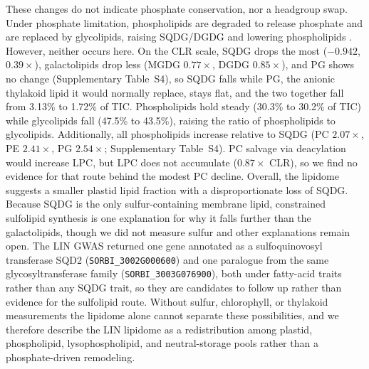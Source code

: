 These changes do not indicate phosphate conservation, nor a headgroup swap. Under phosphate limitation, phospholipids are degraded to release phosphate and are replaced by glycolipids, raising SQDG/DGDG and lowering phospholipids \citep{Essigmann1998, Hartel2000, Jouhet2004, KellyDormann2002, Pfaff2020}. However, neither occurs here. On the CLR scale, SQDG drops the most ($-0.942$, $0.39\times$), galactolipids drop less (MGDG $0.77\times$, DGDG $0.85\times$), and PG shows no change (Supplementary Table~S4), so SQDG falls while PG, the anionic thylakoid lipid it would normally replace, stays flat, and the two together fall from 3.13\% to 1.72\% of TIC. Phospholipids hold steady (30.3\% to 30.2\% of TIC) while glycolipids fall (47.5\% to 43.5\%), raising the ratio of phospholipids to glycolipids. Additionally, all phospholipids increase relative to SQDG (PC $2.07\times$, PE $2.41\times$, PG $2.54\times$; Supplementary Table~S4). PC salvage via deacylation would increase LPC, but LPC does not accumulate ($0.87\times$ CLR), so we find no evidence for that route behind the modest PC decline. Overall, the lipidome suggests a smaller plastid lipid fraction with a disproportionate loss of SQDG. Because SQDG is the only sulfur-containing membrane lipid, constrained sulfolipid synthesis is one explanation for why it falls further than the galactolipids, though we did not measure sulfur and other explanations remain open. The LIN GWAS returned one gene annotated as a sulfoquinovosyl transferase SQD2 (\texttt{SORBI\_3002G000600}) and one paralogue from the same glycosyltransferase family (\texttt{SORBI\_3003G076900}), both under fatty-acid traits rather than any SQDG trait, so they are candidates to follow up rather than evidence for the sulfolipid route. Without sulfur, chlorophyll, or thylakoid measurements the lipidome alone cannot separate these possibilities, and we therefore describe the LIN lipidome as a redistribution among plastid, phospholipid, lysophospholipid, and neutral-storage pools rather than a phosphate-driven remodeling.

